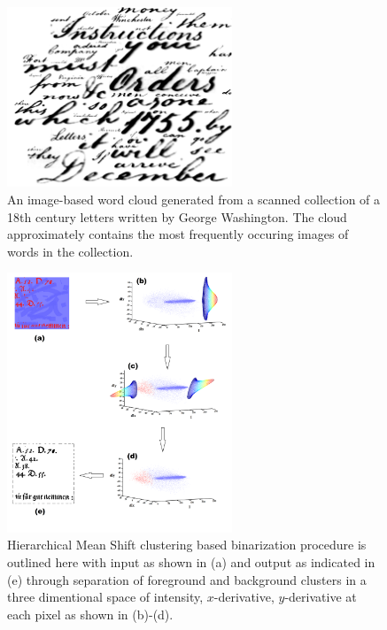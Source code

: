 \documentclass[10pt, a4paper]{article}
\begin{document}
{\begin{enumerate}
\begin{figure}[!htbp]
	\centering
	\includegraphics[width=0.6\textwidth]{figures/research/word_cloud_washington.png}
	\caption{\label{fig:OCR2} An image-based word cloud generated from a scanned collection of a 18th century letters written by George Washington. The cloud approximately contains the most frequently occuring images of words in the collection.} 
\end{figure}

\begin{figure}[!htbp]
	\centering
	\includegraphics[width=0.6\textwidth]{figures/research/BgFgClus.png}
	\caption{\label{fig:OCR1} Hierarchical Mean Shift clustering based binarization procedure is outlined here with input as shown in (a) and output as indicated in (e) through separation of foreground and background clusters in a three dimentional space of intensity, $x$-derivative, $y$-derivative at each pixel as shown in (b)-(d).} 
\end{figure}


\end{enumerate}}
\end{document}
